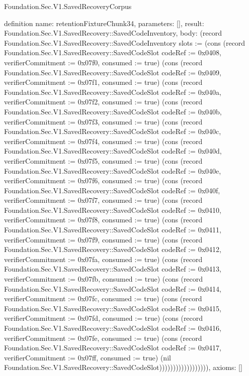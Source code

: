 \begin{lexlean}{Foundation.Sec.V1.SavedRecoveryCorpus}
\begin{semanticmodule}
definition{
  name: retentionFixtureChunk34,
  parameters: [],
  result: Foundation.Sec.V1.SavedRecovery::SavedCodeInventory,
  body: (record Foundation.Sec.V1.SavedRecovery::SavedCodeInventory {slots := (cons (record Foundation.Sec.V1.SavedRecovery::SavedCodeSlot {codeRef := 0x0408, verifierCommitment := 0x07f0, consumed := true}) (cons (record Foundation.Sec.V1.SavedRecovery::SavedCodeSlot {codeRef := 0x0409, verifierCommitment := 0x07f1, consumed := true}) (cons (record Foundation.Sec.V1.SavedRecovery::SavedCodeSlot {codeRef := 0x040a, verifierCommitment := 0x07f2, consumed := true}) (cons (record Foundation.Sec.V1.SavedRecovery::SavedCodeSlot {codeRef := 0x040b, verifierCommitment := 0x07f3, consumed := true}) (cons (record Foundation.Sec.V1.SavedRecovery::SavedCodeSlot {codeRef := 0x040c, verifierCommitment := 0x07f4, consumed := true}) (cons (record Foundation.Sec.V1.SavedRecovery::SavedCodeSlot {codeRef := 0x040d, verifierCommitment := 0x07f5, consumed := true}) (cons (record Foundation.Sec.V1.SavedRecovery::SavedCodeSlot {codeRef := 0x040e, verifierCommitment := 0x07f6, consumed := true}) (cons (record Foundation.Sec.V1.SavedRecovery::SavedCodeSlot {codeRef := 0x040f, verifierCommitment := 0x07f7, consumed := true}) (cons (record Foundation.Sec.V1.SavedRecovery::SavedCodeSlot {codeRef := 0x0410, verifierCommitment := 0x07f8, consumed := true}) (cons (record Foundation.Sec.V1.SavedRecovery::SavedCodeSlot {codeRef := 0x0411, verifierCommitment := 0x07f9, consumed := true}) (cons (record Foundation.Sec.V1.SavedRecovery::SavedCodeSlot {codeRef := 0x0412, verifierCommitment := 0x07fa, consumed := true}) (cons (record Foundation.Sec.V1.SavedRecovery::SavedCodeSlot {codeRef := 0x0413, verifierCommitment := 0x07fb, consumed := true}) (cons (record Foundation.Sec.V1.SavedRecovery::SavedCodeSlot {codeRef := 0x0414, verifierCommitment := 0x07fc, consumed := true}) (cons (record Foundation.Sec.V1.SavedRecovery::SavedCodeSlot {codeRef := 0x0415, verifierCommitment := 0x07fd, consumed := true}) (cons (record Foundation.Sec.V1.SavedRecovery::SavedCodeSlot {codeRef := 0x0416, verifierCommitment := 0x07fe, consumed := true}) (cons (record Foundation.Sec.V1.SavedRecovery::SavedCodeSlot {codeRef := 0x0417, verifierCommitment := 0x07ff, consumed := true}) (nil Foundation.Sec.V1.SavedRecovery::SavedCodeSlot)))))))))))))))))}),
  axioms: []
}


\end{semanticmodule}
\end{lexlean}
